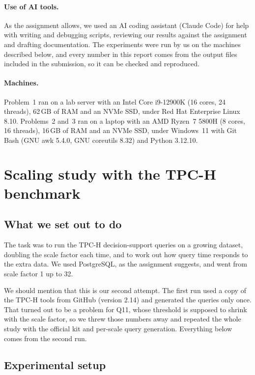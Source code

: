 \documentclass[11pt,a4paper]{article}
\begin{document}
\paragraph{Use of AI tools.} As the assignment allows, we used an AI coding
assistant (Claude Code) for help with writing and debugging scripts, reviewing
our results against the assignment and drafting documentation. The experiments
were run by us on the machines described below, and every number in this
report comes from the output files included in the submission, so it can be
checked and reproduced.

\paragraph{Machines.} Problem~1 ran on a lab server with an Intel Core
i9-12900K (16 cores, 24 threads), 62\,GB of RAM and an NVMe SSD, under Red Hat
Enterprise Linux 8.10. Problems~2 and~3 ran on a laptop with an AMD Ryzen~7
5800H (8 cores, 16 threads), 16\,GB of RAM and an NVMe SSD, under Windows~11
with Git Bash (GNU awk 5.4.0, GNU coreutils 8.32) and Python 3.12.10.

\section{Scaling study with the TPC-H benchmark}
\label{sec:p1}

\subsection{What we set out to do}

The task was to run the TPC-H decision-support queries on a growing dataset,
doubling the scale factor each time, and to work out how query time responds
to the extra data. We used PostgreSQL, as the assignment suggests, and went
from scale factor 1 up to 32.

We should mention that this is our second attempt. The first run used a
copy of the TPC-H tools from GitHub (version 2.14) and generated the queries
only once. That turned out to be a problem for Q11, whose threshold is
supposed to shrink with the scale factor, so we threw those numbers away and
repeated the whole study with the official kit and per-scale query
generation. Everything below comes from the second run.

\subsection{Experimental setup}
\end{document}

